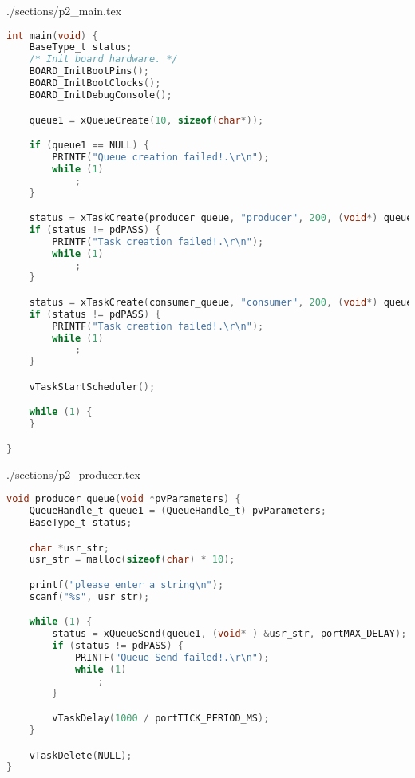 \begin{filecontents}[overwrite]{./sections/p2_main.tex}
\begin{lstlisting}[language=c,caption=Problem 2 main, label=list:p2_main]
int main(void) {
    BaseType_t status;
    /* Init board hardware. */
    BOARD_InitBootPins();
    BOARD_InitBootClocks();
    BOARD_InitDebugConsole();

    queue1 = xQueueCreate(10, sizeof(char*));

    if (queue1 == NULL) {
        PRINTF("Queue creation failed!.\r\n");
        while (1)
            ;
    }

    status = xTaskCreate(producer_queue, "producer", 200, (void*) queue1, 2, NULL);
    if (status != pdPASS) {
        PRINTF("Task creation failed!.\r\n");
        while (1)
            ;
    }

    status = xTaskCreate(consumer_queue, "consumer", 200, (void*) queue1, 3, NULL);
    if (status != pdPASS) {
        PRINTF("Task creation failed!.\r\n");
        while (1)
            ;
    }

    vTaskStartScheduler();

    while (1) {
    }

}
\end{lstlisting}
\end{filecontents}

\begin{filecontents}[overwrite]{./sections/p2_producer.tex}
\begin{lstlisting}[language=c,caption=Problem 2 Producer Queue, label=list:p2_prod]
void producer_queue(void *pvParameters) {
    QueueHandle_t queue1 = (QueueHandle_t) pvParameters;
    BaseType_t status;

    char *usr_str;
    usr_str = malloc(sizeof(char) * 10);

    printf("please enter a string\n");
    scanf("%s", usr_str);

    while (1) {
        status = xQueueSend(queue1, (void* ) &usr_str, portMAX_DELAY);
        if (status != pdPASS) {
            PRINTF("Queue Send failed!.\r\n");
            while (1)
                ;
        }

        vTaskDelay(1000 / portTICK_PERIOD_MS);
    }

    vTaskDelete(NULL);
}
\end{lstlisting}
\end{filecontents}



